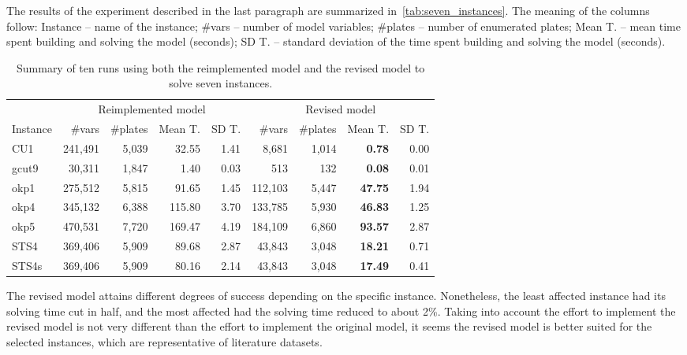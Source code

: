 \documentclass[smallextended]{svjour3}       %
\begin{document}
The results of the experiment described in the last paragraph are summarized in~\autoref{tab:seven_instances}.
The meaning of the columns follow:
Instance -- name of the instance; \#vars -- number of model variables; \#plates -- number of enumerated plates; Mean T. -- mean time spent building and solving the model (seconds); SD T. -- standard deviation of the time spent building and solving the model (seconds).

\begin{table}
\caption{Summary of ten runs using both the reimplemented model and the revised model to solve seven instances.}
\setlength\tabcolsep{2.5px}
\def\arraystretch{1.1}
\begin{tabular}{@{\extracolsep{4pt}}lrrrrrrrr@{}}
& \multicolumn{4}{c}{Reimplemented model} & \multicolumn{4}{c}{Revised model}\\
\cline{2-5}\cline{6-9}
Instance & \#vars & \#plates & Mean T. & SD T. & \#vars & \#plates & Mean T. & SD T.\\
\hline
CU1 & 241,491 & 5,039 & 32.55 & 1.41 & 8,681 & 1,014 & \bf{0.78} & 0.00 \\
gcut9 & 30,311 & 1,847 & 1.40 & 0.03 & 513 & 132 & \bf{0.08} & 0.01 \\
okp1 & 275,512 & 5,815 & 91.65 & 1.45 & 112,103 & 5,447 & \bf{47.75} & 1.94 \\
okp4 & 345,132 & 6,388 & 115.80 & 3.70 & 133,785 & 5,930 & \bf{46.83} & 1.25 \\
okp5 & 470,531 & 7,720 & 169.47 & 4.19 & 184,109 & 6,860 & \bf{93.57} & 2.87 \\
STS4 & 369,406 & 5,909 & 89.68 & 2.87 & 43,843 & 3,048 & \bf{18.21} & 0.71 \\
STS4s & 369,406 & 5,909 & 80.16 & 2.14 & 43,843 & 3,048 & \bf{17.49} & 0.41 \\
\hline
\end{tabular}
\label{tab:seven_instances}
\end{table}

The revised model attains different degrees of success depending on the specific instance.
Nonetheless, the least affected instance had its solving time cut in half, and the most affected had the solving time reduced to about 2\%.
Taking into account the effort to implement the revised model is not very different than the effort to implement the original model, it seems the revised model is better suited for the selected instances, which are representative of literature datasets.
\end{document}
